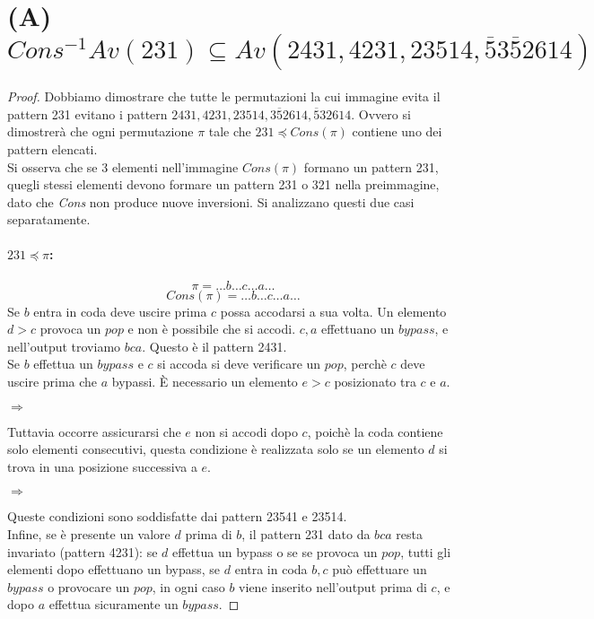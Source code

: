 \documentclass[10pt,a4paper]{article}
\begin{document}
\section*{(A) $Cons^{-1}Av(231) \subseteq Av(2431, 4231, 23514, \overline{5}3\overline{5}2614)$}
\begin{proof}
Dobbiamo dimostrare che tutte le permutazioni la cui immagine evita il pattern 231 evitano i pattern $2431, 4231, 23514, 3\overline{5}2614, \overline{5}32614$. Ovvero si dimostrerà che ogni permutazione $\pi$ tale che $231\preceq{Cons}(\pi)$ contiene uno dei pattern elencati.\\
Si osserva che se 3 elementi nell'immagine $Cons(\pi)$ formano un pattern 231, quegli stessi elementi devono formare un pattern 231 o 321 nella preimmagine, dato che \textit{Cons} non produce nuove inversioni. Si analizzano questi due casi separatamente.
\paragraph*{$231\preceq\pi$:}$$\pi=\dots b\dots c\dots a\dots$$$$Cons(\pi)=\dots b\dots c\dots a\dots$$
Se $b$ entra in coda deve uscire prima $c$ possa accodarsi a sua volta. Un elemento $d>c$ provoca un $pop$ e non è possibile che si accodi. $c,a$ effettuano un $bypass$, e nell'output troviamo $bca$. Questo è il pattern 2431.\\
Se $b$ effettua un $bypass$ e $c$ si accoda si deve verificare un $pop$, perchè $c$ deve uscire prima che $a$ bypassi. È necessario un elemento $e>c$ posizionato tra $c$ e $a$.
\begin{center}
$\Rightarrow$
\end{center}
Tuttavia occorre assicurarsi che $e$ non si accodi dopo $c$, poichè la coda contiene solo elementi consecutivi, questa condizione è realizzata solo se un elemento $d$ si trova in una posizione successiva a $e$.
\begin{center}
$\Rightarrow$
\end{center}
Queste condizioni sono soddisfatte dai pattern 23541 e 23514.\\
Infine, se è presente un valore $d$ prima di $b$, il pattern 231 dato da $bca$ resta invariato (pattern 4231): se $d$ effettua un bypass o se se provoca un $pop$, tutti gli elementi dopo effettuano un bypass, se $d$ entra in coda $b,c$ può effettuare un $bypass$ o provocare un $pop$, in ogni caso $b$ viene inserito nell'output prima di $c$, e dopo $a$ effettua sicuramente un $bypass$.

\end{proof}
\end{document}
